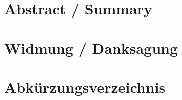 \documentclass[12pt, a4paper, sectionentrydots=true, listof=totoc, listof=entryprefix, numbers=endperiod]{scrartcl}
\begin{document}
\section*{Abstract / Summary}
\begin{spacing}{1.25} 

\end{spacing} 
%
%
%
%
\pagebreak 
\clearpage
{}
\clearpage
\section*{Widmung / Danksagung} 
\begin{spacing}{1.25}

\end{spacing} 
%
%
%
%
\pagebreak 
{}
\begin{spacing}{1.0}
\tableofcontents
\end{spacing}
%
%
%
%
\pagebreak 
\begin{spacing}{1.0}
\listoffigures
\end{spacing}
%
%
%
%
\pagebreak 
\begin{spacing}{1.0}
\listoftables
\end{spacing}
%
%
%
%
% 
\pagebreak 
\clearpage
{}
\clearpage
\section*{Abkürzungsverzeichnis} 
\begin{acronym}[SEPSEPSEP]
\setlength{\parskip}{0ex}

\end{acronym}
\pagebreak 
%
%
%
%
% 
\clearpage
{}
\clearpage
\end{document}
